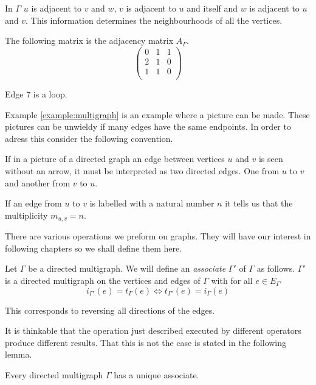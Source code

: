 \begin{example}
	In $\Gamma$ $u$ is adjacent to $v$ and $w$, $v$ is adjacent to $u$ and
	itself and $w$ is adjacent to $u$ and $v$. This information determines
	the neighbourhoods of all the vertices.
	
	The following matrix is the adjacency matrix $A_{\Gamma}$.
	\[
		\left(
		\begin{array}{ccc}
			0 & 1 & 1 \\
			2 & 1 & 0 \\
			1 & 1 & 0 \\
		\end{array}
		\right)
	\]
	
	Edge $7$ is a loop.
\end{example}

Example \ref{example:multigraph} is an example where a picture can be made.
These pictures can be unwieldy if many edges have the same endpoints. In order
to adress this consider the following convention.

\begin{remark}
	If in a picture of a directed graph an edge between vertices $u$ and $v$
	is seen without an arrow, it must be interpreted as two directed edges.
	One from $u$ to $v$ and another from $v$ to $u$.
	
	If an edge from $u$ to $v$ is labelled with a natural number $n$ it
	tells us that the multiplicity $m_{u,v} = n$. 
\end{remark}

There are various operations we preform on graphs. They will have our interest
in following chapters so we shall define them here.

\begin{definition}
	Let $\Gamma$ be a directed multigraph. We will define an
	\emph{associate} $\Gamma'$ of $\Gamma$ as follows. $\Gamma'$ is a
	directed multigraph on the vertices and edges of $\Gamma$ with for all
	$e\in E_{\Gamma'}$
	\[
		i_{\Gamma'}(e) = t_{\Gamma}(e)
		\Leftrightarrow
		t_{\Gamma'}(e) = i_{\Gamma}(e)
	\]
	
	This corresponds to reversing all directions of the edges.
\end{definition}

It is thinkable that the operation just described executed by different
operators produce different results. That this is not the case is stated in the
following lemma.

\begin{lemma}
	Every directed multigraph $\Gamma$ has a unique associate.
\end{lemma}

